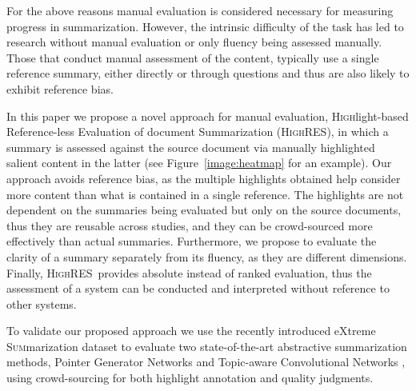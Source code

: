 \documentclass[11pt,a4paper]{article}
\newcommand\highres{\textsc{HighRES}}
\newcommand\xsum{\textsc{XSum}}
\begin{document}
For the above reasons manual evaluation is considered necessary for measuring progress in summarization. However, the intrinsic difficulty of the task has led to research without manual evaluation or only fluency being assessed manually.  Those that conduct manual assessment of the content, typically use a single reference summary, either directly \citep{Celikyilmaz2018, Tan2017} or through questions \citep{narayan18xsum,Narayan2018} and thus are also likely to exhibit reference bias.

In this paper we propose a novel approach for manual evaluation, \textsc{High}light-based \textsc{R}eference-less \textsc{E}valuation of document \textsc{S}ummarization (\highres), in which a summary is assessed against the source document via manually highlighted salient content in the latter (see Figure~\ref{image:heatmap} for an example). Our approach avoids reference bias, as the multiple highlights obtained help consider more content than what is contained in a single reference. The highlights are not dependent on the summaries being evaluated but only on the source documents, thus they are reusable across studies, and they can be crowd-sourced more effectively than actual summaries. 
Furthermore, we propose to evaluate the clarity of a summary separately from its fluency, as they are different dimensions.
Finally, \highres\ provides absolute instead of ranked evaluation, thus the assessment of a system can be conducted and interpreted without reference to other systems.

To validate our proposed approach we use the recently introduced e\textsc{X}treme \textsc{Sum}marization dataset \citep[\xsum,][]{narayan18xsum} to evaluate two state-of-the-art abstractive summarization methods, Pointer Generator Networks \citep{See2017} and Topic-aware Convolutional Networks \citep{narayan18xsum}, using crowd-sourcing for both highlight annotation and quality judgments.
\end{document}
